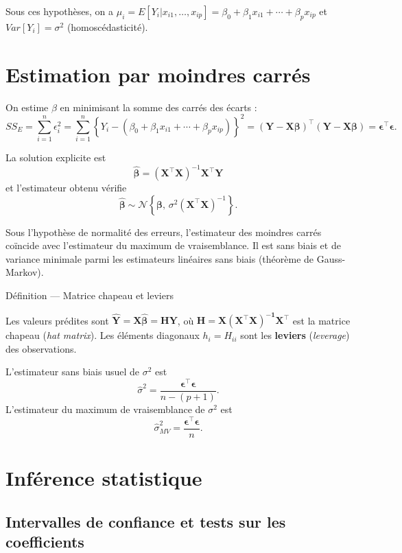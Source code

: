 \documentclass[
  french,
  letterpaper,
  DIV=11,
  numbers=noendperiod]{scrreprt}
\begin{document}
Sous ces hypothèses, on a
\(\mu_i =E[Y_i|x_{i1},\ldots, x_{ip}] =  \beta_0 + \beta_1 x_{i1} + \cdots + \beta_p x_{ip}\)
et \(Var[Y_i] = \sigma^2\) (homoscédasticité).

\section{Estimation par moindres
carrés}\label{estimation-par-moindres-carruxe9s}

On estime \(\beta\) en minimisant la somme des carrés des écarts :
\[SS_E =\sum_{i=1}^n\epsilon_i^2= \sum_{i=1}^n \left\{Y_i - (\beta_0 + \beta_1 x_{i1} + \cdots + \beta_p x_{ip})\right\}^2 = (\boldsymbol{Y}-\boldsymbol{X\beta})^\top(\boldsymbol{Y}-\boldsymbol{X\beta})=\boldsymbol{\epsilon}^\top\boldsymbol{\epsilon}.\]

La solution explicite est
\[\boxed{\hat{\boldsymbol{\beta}} = (\boldsymbol{X}^\top \boldsymbol{X})^{-1} \boldsymbol{X}^\top \boldsymbol{Y}}\]
et l'estimateur obtenu vérifie
\[\hat{\boldsymbol{\beta}} \sim \mathcal{N}\left\{\boldsymbol{\beta},\, \sigma^2 (\boldsymbol{X}^\top \boldsymbol{X})^{-1}\right\}.\]

Sous l'hypothèse de normalité des erreurs, l'estimateur des moindres
carrés coïncide avec l'estimateur du maximum de vraisemblance. Il est
sans biais et de variance minimale parmi les estimateurs linéaires sans
biais (théorème de Gauss-Markov).

{Définition --- Matrice chapeau et leviers}

Les valeurs prédites sont
\(\hat{\boldsymbol{Y}} = \boldsymbol{X\hat{\beta}} = \boldsymbol{HY}\),
où \(\boldsymbol{H} = \boldsymbol{X(X^\top X)^{-1}X^\top}\) est la
matrice chapeau (\emph{hat matrix}). Les éléments diagonaux
\(h_i = H_{ii}\) sont les \textbf{leviers} (\emph{leverage}) des
observations.

L'estimateur sans biais usuel de \(\sigma^2\) est
\[\hat\sigma^2 = \frac{\boldsymbol{\epsilon}^\top\boldsymbol{\epsilon}}{n-(p+1)}.\]
L'estimateur du maximum de vraisemblance de \(\sigma^2\) est
\[\hat\sigma^2_{MV} = \frac{\boldsymbol{\epsilon}^\top\boldsymbol{\epsilon}}{n}.\]

\section{Inférence statistique}\label{infuxe9rence-statistique}

\subsection{Intervalles de confiance et tests sur les
coefficients}\label{intervalles-de-confiance-et-tests-sur-les-coefficients}
\end{document}
